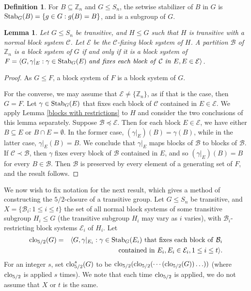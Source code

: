 \documentclass{amsart}
\newtheorem{lem}[thrm]{Lemma}
\theoremstyle{definition}
\newtheorem{definition}[thrm]{Definition}
\theoremstyle{remark}
\numberwithin{equation}{section}
\def\Z{{\mathbb Z}}
\def\la{{\langle}}
\def\ra{{\rangle}}
\def\Stab{{\rm Stab}}
\def\cal{\mathcal}
\def\clo{{\rm clo}}
\begin{document}
\begin{definition}
For $B\subseteq\Z_n$ and $G\le S_n$, the setwise stabilizer of $B$ in $G$ is $\Stab_G(B) = \{g\in G:g(B) = B\}$, and is a subgroup of $G$.
\end{definition}

\begin{lem}\label{5/2 blocks preserved}
Let $G\le S_n$ be transitive, and $H\le G$ such that $H$ is transitive with a normal block system ${\cal C}$.  Let ${\cal E}$ be the ${\cal C}$-fixing block system of $H$.  A partition ${\cal B}$ of $\Z_n$ is a block system of $G$ if and only if it is a block system of $F = \la G,\gamma\vert_E:\gamma\in\Stab_G(E){\it \ and\ fixes\ each\ block\ of\ }{\cal C}{\it \ in\ }E, E\in{\cal E}\ra$.
\end{lem}

\begin{proof}
As $G\le F$, a block system of $F$ is a block system of $G$.

For the converse, we may assume that ${\cal E}\not = \{\Z_n\}$, as if that is the case, then $G = F$.  Let $\gamma\in\Stab_G(E)$ that fixes each block of ${\cal C}$ contained in $E\in{\cal E}$.  We apply Lemma \ref{blocks with restrictions} to $H$ and consider the two conclusions of this lemma separately.  Suppose ${\cal B}\preceq{\cal E}$.  Then for each block $E\in{\cal E}$, we have either $B\subseteq E$ or $B\cap E = \emptyset$.  In the former case, $(\gamma\vert_E)(B) = \gamma(B)$, while in the latter case, $\gamma\vert_E(B) = B$.  We conclude that $\gamma\vert_E$ maps blocks of ${\cal B}$ to blocks of ${\cal B}$.  If ${\cal C}\prec{\cal B}$, then $\gamma$ fixes every block of ${\cal B}$ contained in $E$, and so $(\gamma\vert_E)(B) = B$ for every $B\in{\cal B}$.  Then ${\cal B}$ is preserved by every element of a generating set of $F$, and the result follows.
\end{proof}

We now wish to fix notation for the next result, which gives a method of constructing the $5/2$-closure of a transitive group.
Let $G\le S_n$ be transitive, and $X = \{{\cal B}_i:1\le i\le t\}$ the set of all normal block systems of some transitive subgroup $H_i\le G$ (the transitive subgroup $H_i$ may vary as $i$ varies), with ${\cal B}_i$-restricting block systems ${\cal E}_i$ of $H_i$.  Let
\begin{eqnarray*}
\clo_{5/2}(G) & = & \la G, \gamma\vert_{E_i}:\gamma\in\Stab_G(E_i){\rm\ that\ fixes\ each\ block\ of\ }{\cal B}_i\\
              &   & {\rm contained\ in\ }E_i, E_i\in{\cal E}_i, 1\le i\le t\ra.
\end{eqnarray*}
For an integer $s$, set $\clo_{5/2}^s(G)$ to be $\clo_{5/2}(\clo_{5/2}(\cdots(\clo_{5/2}(G))\ldots))$ (where $\clo_{5/2}$ is applied $s$ times).  We note that each time $\clo_{5/2}$ is applied, we do not assume that $X$ or $t$ is the same.
\end{document}
